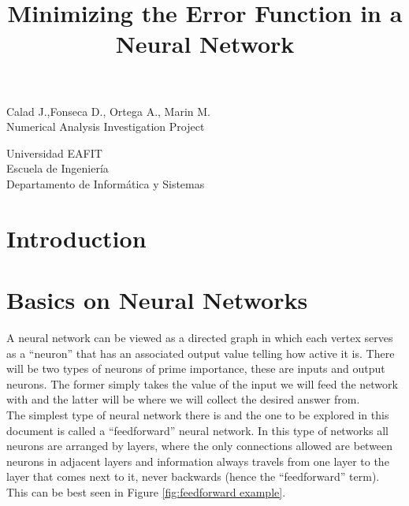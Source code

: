 \documentclass[a4paper, 12pt]{amsart}
\begin{document}
\title{Minimizing the Error Function in a Neural Network}


\maketitle

\vfill
\hfill
\begin{center}
Calad J.,Fonseca D., Ortega A., Marin M.\\

Numerical Analysis Investigation Project
\end{center}
\vfill
\hfill

\begin{center}
Universidad EAFIT\\
Escuela de Ingeniería\\
Departamento de Informática y Sistemas\\
\end{center}
\clearpage

\tableofcontents
\clearpage
\section{Introduction}
\section{Basics on Neural Networks}
A neural network can be viewed as a directed graph in which each vertex serves
as a ``neuron'' that has an associated output value telling how active it is.
There will be two types of neurons of prime importance, these are inputs and
output neurons. The former simply takes the value of the input we will feed the
network with and the latter will be where we will collect the desired answer
from.\\
The simplest type of neural network there is and the one to be explored
in this document is called  a ``feedforward'' neural network. In this type of
networks all neurons are arranged by layers, where the only connections allowed
are between neurons in adjacent layers and information always travels from one
layer to the layer that comes next to it, never backwards (hence the
``feedforward'' term). This can be best seen in Figure
\ref{fig:feedforward example}.
\end{document}
